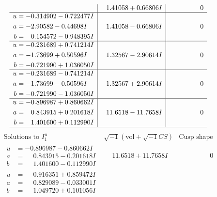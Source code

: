 \documentclass[1p]{elsarticle_modified}
\theoremstyle{definition}
\newcommand{\I}{\sqrt{-1}}
\begin{document}
$$\begin{array}{c|c|c}
 & \phantom{-}1.41058 + 0.66806 I & \phantom{-0.000000 } 0 \\ \hline\begin{aligned}
u &= -0.314902 - 0.722477 I \\
a &= -2.90582 - 0.44698 I \\
b &= \phantom{-}0.154572 - 0.948395 I\end{aligned}
 & \phantom{-}1.41058 - 0.66806 I & \phantom{-0.000000 } 0 \\ \hline\begin{aligned}
u &= -0.231689 + 0.741214 I \\
a &= -1.73699 + 0.50596 I \\
b &= -0.721990 + 1.036050 I\end{aligned}
 & \phantom{-}1.32567 - 2.90614 I & \phantom{-0.000000 } 0 \\ \hline\begin{aligned}
u &= -0.231689 - 0.741214 I \\
a &= -1.73699 - 0.50596 I \\
b &= -0.721990 - 1.036050 I\end{aligned}
 & \phantom{-}1.32567 + 2.90614 I & \phantom{-0.000000 } 0 \\ \hline\begin{aligned}
u &= -0.896987 + 0.860662 I \\
a &= \phantom{-}0.843915 + 0.201618 I \\
b &= \phantom{-}1.401600 + 0.112990 I\end{aligned}
 & \phantom{-}11.6518 - 11.7658 I & \phantom{-0.000000 } 0\\
 \hline 
 \end{array}$$\newpage$$\begin{array}{c|c|c}  
\text{Solutions to }I^u_{1}& \I (\text{vol} + \sqrt{-1}CS) & \text{Cusp shape}\\
 \hline 
\begin{aligned}
u &= -0.896987 - 0.860662 I \\
a &= \phantom{-}0.843915 - 0.201618 I \\
b &= \phantom{-}1.401600 - 0.112990 I\end{aligned}
 & \phantom{-}11.6518 + 11.7658 I & \phantom{-0.000000 } 0 \\ \hline\begin{aligned}
u &= \phantom{-}0.916351 + 0.859472 I \\
a &= \phantom{-}0.829089 - 0.033001 I \\
b &= \phantom{-}1.049720 + 0.101056 I\end{aligned}

\end{array}$$
\end{document}
